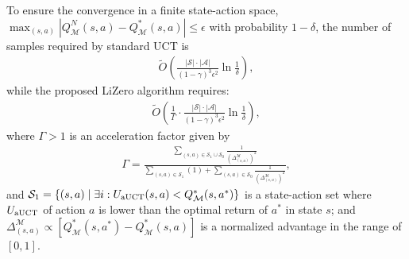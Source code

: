 \begin{theorem}
\label{the:converage}
To ensure the convergence in a finite state-action space, $\max_{(s,a)}|Q^{N}_{\mathcal{M}}(s,a)-Q_{\mathcal{M}}^{*}(s,a)|\leq \epsilon$ with probability \(1-\delta\), the number of samples required by standard UCT is 
\begin{equation}
\begin{aligned}
\tilde{O}\left(\frac{|\mathcal{S}|\cdot|\mathcal{A}|}{(1-\gamma)^3\epsilon^2}\ln\frac{1}{\delta}\right),
\end{aligned}
\end{equation}
while the proposed LiZero algorithm requires:
\begin{equation}
\begin{aligned}
    \tilde{O}\left(\frac{1}{\Gamma} \cdot \frac{|\mathcal{S}|\cdot|\mathcal{A}|}{(1-\gamma)^3\epsilon^2}\ln\frac{1}{\delta}\right),
\end{aligned}
\end{equation}
where $\Gamma> 1$ is an acceleration factor given by
\begin{equation}
\begin{aligned}
\Gamma =\frac
{\sum_{(s,a)\in \mathcal{S}_1\cup \mathcal{S}_0 } \frac{1}{(\Delta^{\mathcal{M}}_{(s,a)})^2}}
{\sum_{(s,a)\in\mathcal{S}_1} (1) + 
\sum_{(s,a)\in\mathcal{S}_{0}} \frac{1}{(\Delta^{\mathcal{M}}_{(s,a)})^2}},
\end{aligned}
\end{equation}
and \( \mathcal{S}_1 = \{(s, a) \mid \exists i : U_{\rm aUCT}(s, a) < Q^{*}_{\mathcal{M}}(s, a^{*})\} \) is a state-action set where $U_{\rm aUCT}$ of action $a$ is lower than the optimal return of $a^{*}$ in state $s$;
and $\Delta^{\mathcal{M}}_{(s,a)} \propto [Q_{\mathcal{M}}^{*}(s,a^{*}) - Q_{\mathcal{M}}^{*}(s,a)]$ is a normalized advantage in the range of $[0, 1]$.
\end{theorem}


